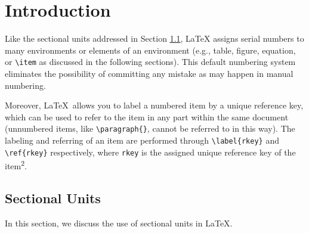 \documentclass{article}
\begin{document}
\section{Introduction}
Like the sectional units addressed in Section \ref{sec:section_units}, LaTeX assigns serial numbers to many environments or elements of an environment (e.g., table, figure, equation, or \texttt{\textbackslash item} as discussed in the following sections). This default numbering system eliminates the possibility of committing any mistake as may happen in manual numbering.

Moreover, \LaTeX\ allows you to label a numbered item by a unique reference key, which can be used to refer to the item in any part within the same document (unnumbered items, like \texttt{\textbackslash paragraph\{\}}, cannot be referred to in this way). The labeling and referring of an item are performed through \texttt{\textbackslash label\{rkey\}} and \texttt{\textbackslash ref\{rkey\}} respectively, where \texttt{rkey} is the assigned unique reference key of the item\textsuperscript{2}.

\subsection{Sectional Units}
\label{sec:section_units}
In this section, we discuss the use of sectional units in LaTeX.
\end{document}

